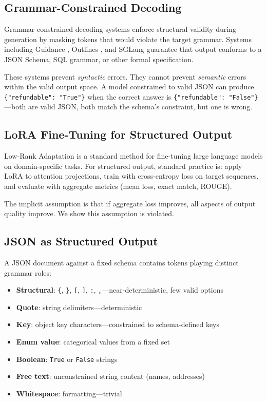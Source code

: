 \documentclass[11pt]{article}
\begin{document}
\subsection{Grammar-Constrained Decoding}

Grammar-constrained decoding systems enforce structural validity during generation by masking tokens that would violate the target grammar. Systems including Guidance \cite{guidance2024}, Outlines \cite{willard2023outlines}, and SGLang \cite{zheng2024sglang} guarantee that output conforms to a JSON Schema, SQL grammar, or other formal specification.

These systems prevent \emph{syntactic} errors. They cannot prevent \emph{semantic} errors within the valid output space. A model constrained to valid JSON can produce \texttt{\{"refundable": "True"\}} when the correct answer is \texttt{\{"refundable": "False"\}}---both are valid JSON, both match the schema's constraint, but one is wrong. 

\subsection{LoRA Fine-Tuning for Structured Output}

Low-Rank Adaptation \cite{hu2021lora} is a standard method for fine-tuning large language models on domain-specific tasks. For structured output, standard practice is: apply LoRA to attention projections, train with cross-entropy loss on target sequences, and evaluate with aggregate metrics (mean loss, exact match, ROUGE).

The implicit assumption is that if aggregate loss improves, all aspects of output quality improve. We show this assumption is violated.

\subsection{JSON as Structured Output}

A JSON document against a fixed schema contains tokens playing distinct grammar roles:

\begin{itemize}
\item \textbf{Structural}: \texttt{\{}, \texttt{\}}, \texttt{[}, \texttt{]}, \texttt{:}, \texttt{,}---near-deterministic, few valid options
\item \textbf{Quote}: string delimiters---deterministic
\item \textbf{Key}: object key characters---constrained to schema-defined keys
\item \textbf{Enum value}: categorical values from a fixed set
\item \textbf{Boolean}: \texttt{True} or \texttt{False} strings
\item \textbf{Free text}: unconstrained string content (names, addresses)
\item \textbf{Whitespace}: formatting---trivial
\end{itemize}
\end{document}
